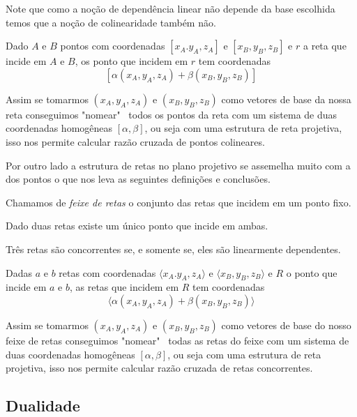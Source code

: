 Note que como a noção de dependência linear não depende da base escolhida temos que a noção de colinearidade também não.

\begin{cor}
Dado $A$ e $B$ pontos com coordenadas $[x_A.y_A,z_A]$ e $[x_B,y_B,z_B]$ e $r$ a reta que incide em $A$ e $B$, os ponto que incidem em $r$ tem coordenadas \[[\alpha(x_A,y_A,z_A) +\beta(x_B,y_B,z_B)]\]
\end{cor}

Assim se tomarmos $(x_A,y_A,z_A)$ e $(x_B,y_B,z_B)$ como vetores de base da nossa reta conseguimos "nomear" \ todos os pontos da reta com um sistema de duas coordenadas homogêneas $[\alpha,\beta]$, ou seja com uma estrutura de reta projetiva, isso nos permite calcular razão cruzada de pontos colineares.

Por outro lado a estrutura de retas no plano projetivo se assemelha muito com a dos pontos o que nos leva as seguintes definições e conclusões.

\begin{defn}
Chamamos de \emph{feixe de retas} o conjunto das retas que incidem em um ponto fixo.
\end{defn}

\begin{prop}
Dado duas retas existe um único ponto que incide em ambas.
\end{prop}

\begin{lem}
Três retas são concorrentes se, e somente se, eles são linearmente dependentes.
\end{lem}

\begin{cor}
Dadas $a$ e $b$ retas com coordenadas $\langle x_A.y_A,z_A \rangle$ e $\langle x_B,y_B,z_B \rangle$ e $R$ o ponto que incide em $a$ e $b$, as retas que incidem em $R$ tem coordenadas \[\langle\alpha(x_A,y_A,z_A) +\beta(x_B,y_B,z_B)\rangle\]
\end{cor}

Assim se tomarmos $(x_A,y_A,z_A)$ e $(x_B,y_B,z_B)$ como vetores de base do nosso feixe de retas conseguimos "nomear" \ todas as retas do feixe com um sistema de duas coordenadas homogêneas $[\alpha,\beta]$, ou seja com uma estrutura de reta projetiva, isso nos permite calcular razão cruzada de retas concorrentes.

\subsection{Dualidade}

